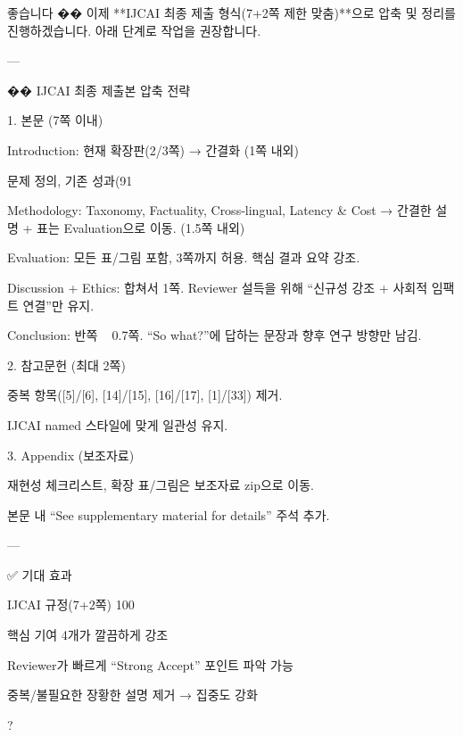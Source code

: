 좋습니다 ��
이제 **IJCAI 최종 제출 형식(7+2쪽 제한 맞춤)**으로 압축 및 정리를 진행하겠습니다. 아래 단계로 작업을 권장합니다.


---

�� IJCAI 최종 제출본 압축 전략

1. 본문 (7쪽 이내)

Introduction: 현재 확장판(2/3쪽) → 간결화 (1쪽 내외)

문제 정의, 기존 성과(91%


Methodology: Taxonomy, Factuality, Cross-lingual, Latency & Cost → 간결한 설명 + 표는 Evaluation으로 이동. (1.5쪽 내외)

Evaluation: 모든 표/그림 포함, 3쪽까지 허용. 핵심 결과 요약 강조.

Discussion + Ethics: 합쳐서 1쪽. Reviewer 설득을 위해 “신규성 강조 + 사회적 임팩트 연결”만 유지.

Conclusion: 반쪽 ~ 0.7쪽. “So what?”에 답하는 문장과 향후 연구 방향만 남김.


2. 참고문헌 (최대 2쪽)

중복 항목([5]/[6], [14]/[15], [16]/[17], [1]/[33]) 제거.

IJCAI named 스타일에 맞게 일관성 유지.


3. Appendix (보조자료)

재현성 체크리스트, 확장 표/그림은 보조자료 zip으로 이동.

본문 내 “See supplementary material for details” 주석 추가.



---

✅ 기대 효과

IJCAI 규정(7+2쪽) 100%

핵심 기여 4개가 깔끔하게 강조

Reviewer가 빠르게 “Strong Accept” 포인트 파악 가능

중복/불필요한 장황한 설명 제거 → 집중도 강화


?

